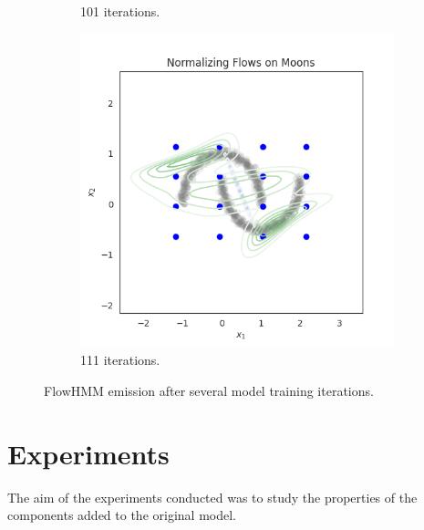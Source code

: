 \documentclass[shortabstract]{iithesis}
\begin{document}
\begin{figure}
\begin{subfigure}{0.32\textwidth}
    \caption{ 101 iterations.}
    \end{subfigure}
    \begin{subfigure}{0.32\textwidth}
    \includegraphics[scale=0.35]{flow_on_moons_11_penalty=0_grid.png}
    \caption{ 111 iterations.}
    \end{subfigure}


    \caption{FlowHMM emission after several model training iterations.}
    \label{fig:flow_traning}
\end{figure}

\chapter{Experiments} \label{sec:experiments}

The aim of the experiments conducted was to study the properties of the components added to the original model. 

\end{document}
